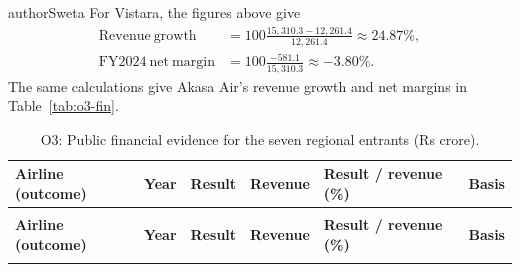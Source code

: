 \begin{mergedcontribution}{authorSweta}
For Vistara, the figures above give
\begin{align*}
\mathrm{Revenue\ growth}
&=100\frac{15{,}310.3-12{,}261.4}{12{,}261.4}\approx24.87\%,\\
\mathrm{FY2024\ net\ margin}
&=100\frac{-581.1}{15{,}310.3}\approx-3.80\%.
\end{align*}
The same calculations give Akasa Air's revenue growth and net margins in Table~\ref{tab:o3-fin}.




\par\begingroup
\flowtablestyle
\fontsize{10}{12}\selectfont
\renewcommand{\arraystretch}{1.15}
\begin{longtable}{|>{\raggedright\arraybackslash}p{}|>{\raggedright\arraybackslash}p{}|>{\raggedright\arraybackslash}p{}|>{\raggedright\arraybackslash}p{}|>{\raggedright\arraybackslash}p{}|>{\raggedright\arraybackslash}p{}|}
\caption{O3: Public financial evidence for the seven regional entrants (Rs crore).}\label{tab:o3-fy25}\\
\hline
\textbf{Airline (outcome)} & \textbf{Year} & \textbf{Result} & \textbf{Revenue} & \textbf{Result / revenue (\%)} & \textbf{Basis} \\
\hline
\endfirsthead
\multicolumn{6}{c}{Table~\thetable\ (continued)}\\
\hline
\textbf{Airline (outcome)} & \textbf{Year} & \textbf{Result} & \textbf{Revenue} & \textbf{Result / revenue (\%)} & \textbf{Basis} \\
\hline
\endhead
\endfoot
\endlastfoot


\end{longtable}
\end{mergedcontribution}
